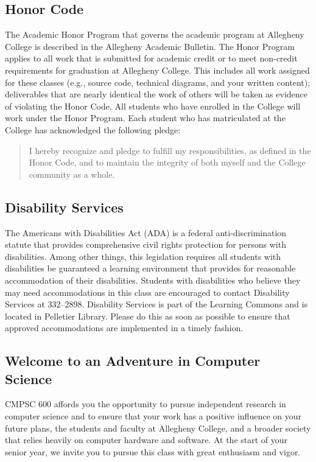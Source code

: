 \documentclass[11pt]{article}
\begin{document}
\subsection*{Honor Code}

The Academic Honor Program that governs the academic program at Allegheny
College is described in the Allegheny Academic Bulletin. The Honor Program
applies to all work that is submitted for academic credit or to meet non-credit
requirements for graduation at Allegheny College. This includes all work
assigned for these classes (e.g., source code, technical diagrams, and your
written content); deliverables that are nearly identical the work of others will
be taken as evidence of violating the Honor Code. All students who have enrolled
in the College will work under the Honor Program. Each student who has
matriculated at the College has acknowledged the following pledge:

\begin{quote}
I hereby recognize and pledge to fulfill my responsibilities, as defined in the Honor Code, and to maintain the
integrity of both myself and the College community as a whole.
\end{quote}

\subsection*{Disability Services}

The Americans with Disabilities Act (ADA) is a federal anti-discrimination
statute that provides comprehensive civil rights protection for persons with
disabilities.  Among other things, this legislation requires all students with
disabilities be guaranteed a learning environment that provides for reasonable
accommodation of their disabilities. Students with disabilities who believe they
may need accommodations in this class are encouraged to contact Disability
Services at 332--2898.  Disability Services is part of the Learning Commons and
is located in Pelletier Library. Please do this as soon as possible to ensure
that approved accommodations are implemented in a timely fashion.

\subsection*{Welcome to an Adventure in Computer Science}

CMPSC 600 affords you the opportunity to pursue independent research in computer
science and to ensure that your work has a positive influence on your future
plans, the students and faculty at Allegheny College, and a broader society that
relies heavily on computer hardware and software.  At the start of your senior
year, we invite you to pursue this class with great enthusiasm and vigor.
\end{document}
